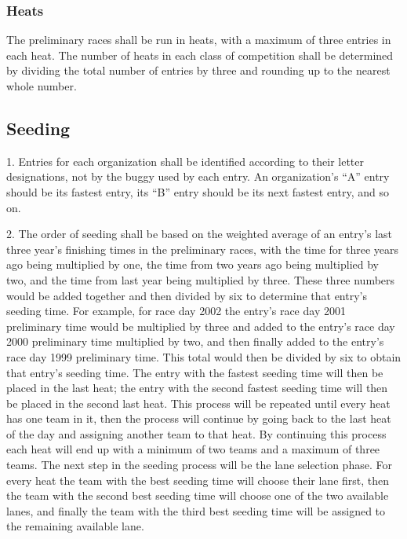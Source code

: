 \documentclass[openany]{book}
\begin{document}
\subsubsection{Heats}

The preliminary races shall be run in heats, with a maximum of three entries in each heat. The number of heats in each class of competition shall be determined by dividing the total number of entries by three and rounding up to the nearest whole number.

\subsection{Seeding}

1. Entries for each organization shall be identified according to their letter designations, not by the buggy used by each entry. An organization’s “A” entry should be its fastest entry, its “B” entry should be its next fastest entry, and so on.

2. The order of seeding shall be based on the weighted average of an entry’s last three year’s finishing times in the preliminary races, with the time for three years ago being multiplied by one, the time from two years ago being multiplied by two, and the time from last year being multiplied by three. These three numbers would be added together and then divided by six to determine that entry’s seeding time. For example, for race day 2002 the entry’s race day 2001 preliminary time would be multiplied by three and added to the entry’s race day 2000 preliminary time multiplied by two, and then finally added to the entry’s race day 1999 preliminary time. This total would then be divided by six to obtain that entry’s seeding time. The entry with the fastest seeding time will then be placed in the last heat; the entry with the second fastest seeding time will then be placed in the second last heat. This process will be repeated until every heat has one team in it, then the process will continue by going back to the last heat of the day and assigning another team to that heat. By continuing this process each heat will end up with a minimum of two teams and a maximum of three teams. The next step in the seeding process will be the lane selection phase. For every heat the team with the best seeding time will choose their lane first, then the team with the second best seeding time will choose one of the two available lanes, and finally the team with the third best seeding time will be assigned to the remaining available lane.
\end{document}
